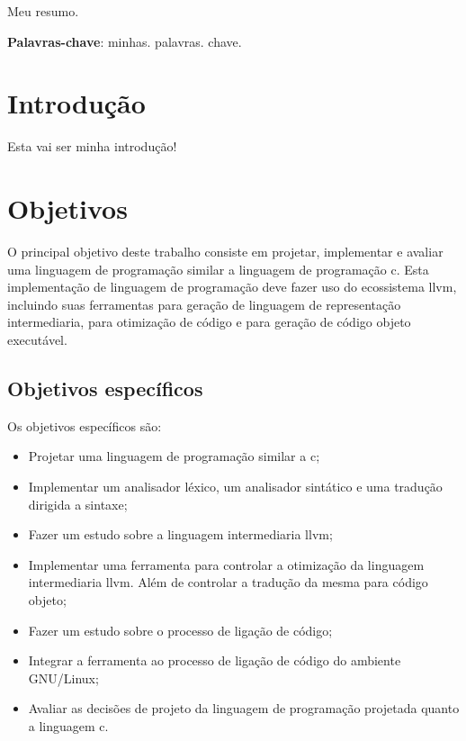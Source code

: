 \documentclass[
  12pt,
  openright,
  twoside,
  a4paper,
  english,
  brazil
]{abntex2}
\begin{document}
\pretextual{}
\imprimircapa{}
\imprimirfolhaderosto{}

\begin{folhadeaprovacao}
  
\end{folhadeaprovacao}

\begin{resumo}
Meu resumo.

\vspace{\onelineskip}
\noindent
\textbf{Palavras-chave}: minhas\@. palavras\@. chave.

\end{resumo}

\begin{KeepFromToc}
  \tableofcontents
\end{KeepFromToc}

\textual{}

\chapter{Introdução}\label{cap:introdução}

Esta vai ser minha introdução\cite{dijkstra1968}!

\chapter{Objetivos}\label{cap:objetivos}

O principal objetivo deste trabalho consiste em projetar, implementar e avaliar uma linguagem de programação similar a linguagem de programação c.
Esta implementação de linguagem de programação deve fazer uso do ecossistema llvm, incluindo suas ferramentas para geração de linguagem de representação intermediaria, para otimização de código e para geração de código objeto executável.

\section{Objetivos específicos}

Os objetivos específicos são:
\begin{itemize}
  \item Projetar uma linguagem de programação similar a c;
  \item Implementar um analisador léxico, um analisador sintático e uma tradução dirigida a sintaxe;
  \item Fazer um estudo sobre a linguagem intermediaria llvm;
  \item Implementar uma ferramenta para controlar a otimização da linguagem intermediaria llvm. Além de controlar a tradução da mesma para código objeto;
  \item Fazer um estudo sobre o processo de ligação de código;
  \item Integrar a ferramenta ao processo de ligação de código do ambiente GNU/Linux;
  \item Avaliar as decisões de projeto da linguagem de programação projetada quanto a linguagem c.
\end{itemize}
\end{document}

